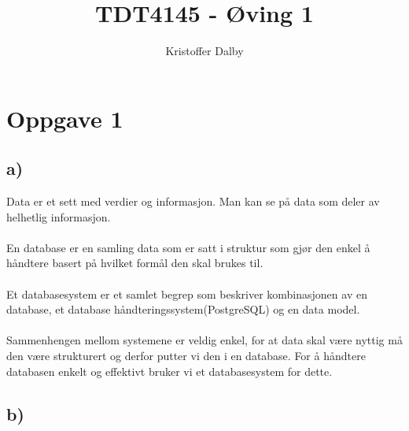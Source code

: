 \documentclass[a4paper, 10pt]{article}
\title{TDT4145 - Øving 1}
\author{Kristoffer Dalby}
\date{}
\begin{document}
\maketitle

\thispagestyle{empty}
\newpage
{}
\setcounter{page}{1}

\section*{Oppgave 1}
\subsection*{a)}
Data er et sett med verdier og informasjon. Man kan se på data som deler av helhetlig informasjon.\\\\
En database er en samling data som er satt i struktur som gjør den enkel å håndtere basert på hvilket formål den skal brukes til.\\\\
Et databasesystem er et samlet begrep som beskriver kombinasjonen av en database, et database håndteringssystem(PostgreSQL) og en data model.\\\\
Sammenhengen mellom systemene er veldig enkel, for at data skal være nyttig må den være strukturert og derfor putter vi den i en database. For å håndtere databasen enkelt og effektivt bruker vi et databasesystem for dette.

\subsection*{b)}
\end{document}

